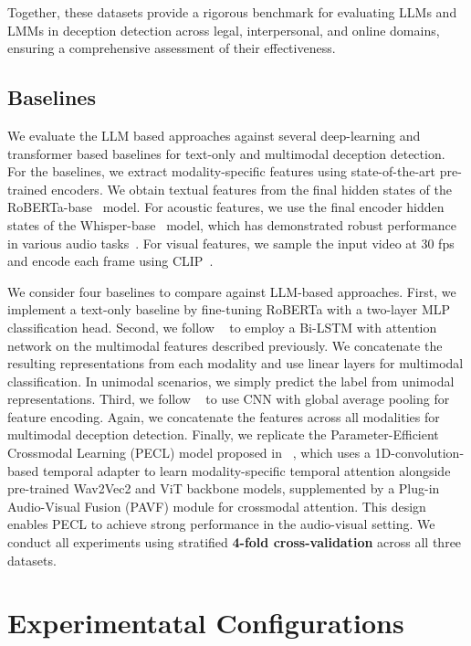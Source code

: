 Together, these datasets provide a rigorous benchmark for evaluating LLMs and LMMs in deception detection across legal, interpersonal, and online domains, ensuring a comprehensive assessment of their effectiveness.

\subsection{Baselines}
We evaluate the LLM based approaches against several deep-learning and transformer based baselines for text-only and multimodal deception detection. For the baselines, we extract modality-specific features using state-of-the-art pre-trained encoders. We obtain textual features from the final hidden states of the RoBERTa-base~\cite{roberta} model. For acoustic features, we use the final encoder hidden states of the Whisper-base~\cite{whisper} model, which has demonstrated robust performance in various audio tasks~\cite{miah, whisper2}. For visual features, we sample the input video at 30 fps and encode each frame using CLIP~\cite{CLIP}. 

We consider four baselines to compare against LLM-based approaches. First, we implement a text-only baseline by fine-tuning RoBERTa with a two-layer MLP classification head. Second, we follow ~\cite{bilstm} to employ a Bi-LSTM with attention network on the multimodal features described previously. We concatenate the resulting representations from each modality and use linear layers for multimodal classification. In unimodal scenarios, we simply predict the label from unimodal representations. Third, we follow  ~\cite{cnn1, DL4} to use CNN with global average pooling for feature encoding. Again, we concatenate the features across all modalities for multimodal deception detection. Finally, we replicate the Parameter-Efficient Crossmodal Learning (PECL) model proposed in  ~\cite{dolos}, which uses a 1D-convolution-based temporal adapter to learn modality-specific temporal attention alongside pre-trained Wav2Vec2 and ViT backbone models, supplemented by a Plug-in Audio-Visual Fusion (PAVF) module for crossmodal attention. This design enables PECL to achieve strong performance in the audio-visual setting. We conduct all experiments using stratified \textbf{4-fold cross-validation} across all three datasets.



\section{Experimentatal Configurations}

